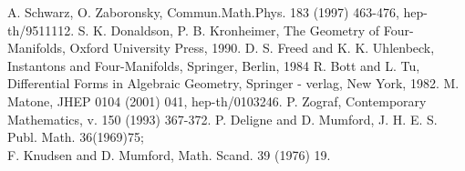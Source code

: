 \documentclass[a4paper,12pt]{article}
\begin{document}
\begin{thebibliography}{99}
 A. Schwarz, O. Zaboronsky, 
Commun.Math.Phys. 183 (1997) 463-476, hep-th/9511112.
S. K. Donaldson, P. B. Kronheimer, The Geometry of 
Four-Manifolds, Oxford University Press, 1990.
D. S. Freed and K. K. Uhlenbeck, Instantons and 
Four-Manifolds, Springer, Berlin, 1984
R. Bott and L. Tu, Differential Forms in Algebraic 
Geometry, Springer - verlag, New York, 1982.
M. Matone, JHEP 0104 (2001) 041, hep-th/0103246. 
P. Zograf, Contemporary Mathematics, v. 150 (1993) 367-372. 
P. Deligne and D. Mumford, J. H. E. S. Publ. Math. 
36(1969)75; \\
F. Knudsen and D. Mumford, Math. Scand. 39 (1976) 19.  
\end{thebibliography}
\vfill\eject
  


  
\end{document}
